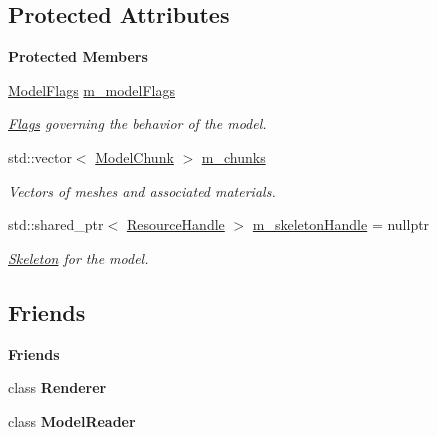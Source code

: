 \subsection*{Protected Attributes}
\begin{Indent}\textbf{ Protected Members}\par
\begin{DoxyCompactItemize}
\item 
\mbox{\label{classrev_1_1_model_afdbf4a54ad622100c881d2a621ba7f5d}} 
\mbox{\hyperlink{classrev_1_1_flags}{Model\+Flags}} \mbox{\hyperlink{classrev_1_1_model_afdbf4a54ad622100c881d2a621ba7f5d}{m\+\_\+model\+Flags}}
\begin{DoxyCompactList}\small\item\em \mbox{\hyperlink{classrev_1_1_flags}{Flags}} governing the behavior of the model. \end{DoxyCompactList}\item 
\mbox{\label{classrev_1_1_model_a8eb685e2fe959f7a88c9ddb91dbb6159}} 
std\+::vector$<$ \mbox{\hyperlink{classrev_1_1_model_chunk}{Model\+Chunk}} $>$ \mbox{\hyperlink{classrev_1_1_model_a8eb685e2fe959f7a88c9ddb91dbb6159}{m\+\_\+chunks}}
\begin{DoxyCompactList}\small\item\em Vectors of meshes and associated materials. \end{DoxyCompactList}\item 
\mbox{\label{classrev_1_1_model_a5f0762fc19b59f52777e58764727ab66}} 
std\+::shared\+\_\+ptr$<$ \mbox{\hyperlink{classrev_1_1_resource_handle}{Resource\+Handle}} $>$ \mbox{\hyperlink{classrev_1_1_model_a5f0762fc19b59f52777e58764727ab66}{m\+\_\+skeleton\+Handle}} = nullptr
\begin{DoxyCompactList}\small\item\em \mbox{\hyperlink{classrev_1_1_skeleton}{Skeleton}} for the model. \end{DoxyCompactList}\end{DoxyCompactItemize}
\end{Indent}
\subsection*{Friends}
\begin{Indent}\textbf{ Friends}\par
\begin{DoxyCompactItemize}
\item 
\mbox{\label{classrev_1_1_model_a70538530bc36e033e360880ef311df61}} 
class {\bfseries Renderer}
\item 
\mbox{\label{classrev_1_1_model_ac3e0a085a76d6fcad904e95ebbe2c6a5}} 
class {\bfseries Model\+Reader}
\end{DoxyCompactItemize}
\end{Indent}
